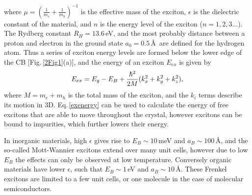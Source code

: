 where $\mu = (\frac{1}{m_e}+\frac{1}{m_h})^{-1}$ is the effective mass of the exciton, $\epsilon$ is the dielectric constant of the material, and $n$ is the energy level of the exciton ($n=1, 2, 3...$). The Rydberg constant $R_H=13.6$\,eV, and the most probably distance between a proton and electron in the ground state $a_0=0.5$\,\AA\, are defined for the hydrogen atom. Thus a series of exciton energy levels are formed below the lower edge of the CB [Fig.\,\ref{2Fig1}(a)], and the energy of an exciton $E_{ex}$ is given by
\begin{equation}
\centering
E_{ex} = E_g - E_B + \frac{\hbar^2}{2M}(k_x^2+k_y^2+k_z^2),
\label{exenergy}
\end{equation}
where $M = m_e+m_h$ is the total mass of the exciton, and the $k_i$ terms describe its motion in 3D. Eq.\,\ref{exenergy} can be used to calculate the energy of free excitons that are able to move throughout the crystal, however excitons can be bound to impurities, which further lowers their energy.

In inorganic materials, high $\epsilon$ gives rise to $E_B \sim 10$\,meV and $a_B \sim 100$\,\AA, and the so-called Mott-Wannier excitons extend over many unit cells, however due to low $E_B$ the effects can only be observed at low temperature. Conversely organic materials have lower $\epsilon$, such that $E_B \sim 1$\,eV and $a_B \sim 10$\,\AA. These Frenkel excitons are limited to a few unit cells, or one molecule in the case of molecular semiconductors.

